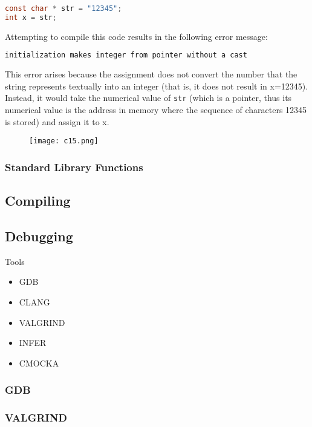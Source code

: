 \documentclass[12pt,a4paper]{article}
\begin{document}
\begin{lstlisting}[language=C]
const char * str = "12345";
int x = str;
\end{lstlisting}

Attempting to compile this code results in the following error message:

\begin{lstlisting}[language=Bash]
initialization makes integer from pointer without a cast
\end{lstlisting}

This error arises because the assignment does not convert the number that the string represents textually into an integer (that is, it does not result in x=12345). Instead, it would take the numerical value of \verb|str| (which is a pointer, thus its numerical value is the address in memory where the sequence of characters 12345 is stored) and assign it to x.

\begin{figure}[!htbp]
	\centering
	\texttt{[image: c15.png]}
\end{figure}




\subsubsection{Standard Library Functions}


\subsection{Compiling}

\subsection{Debugging}

Tools
\begin{itemize}
	\item GDB
	\item CLANG
	\item VALGRIND
	\item INFER
	\item CMOCKA
\end{itemize}

\subsubsection{GDB}
\subsubsection{VALGRIND}
\end{document}
